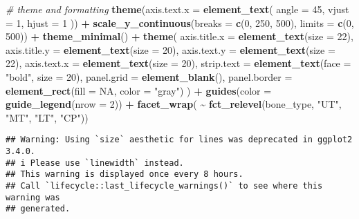 \documentclass[
]{article}
\newenvironment{Shaded}{\begin{snugshade}}{\end{snugshade}}
\newcommand{\AttributeTok}[1]{\textcolor[rgb]{0.13,0.29,0.53}{#1}}
\newcommand{\CommentTok}[1]{\textcolor[rgb]{0.56,0.35,0.01}{\textit{#1}}}
\newcommand{\ConstantTok}[1]{\textcolor[rgb]{0.56,0.35,0.01}{#1}}
\newcommand{\DecValTok}[1]{\textcolor[rgb]{0.00,0.00,0.81}{#1}}
\newcommand{\FunctionTok}[1]{\textcolor[rgb]{0.13,0.29,0.53}{\textbf{#1}}}
\newcommand{\NormalTok}[1]{#1}
\newcommand{\SpecialCharTok}[1]{\textcolor[rgb]{0.81,0.36,0.00}{\textbf{#1}}}
\newcommand{\StringTok}[1]{\textcolor[rgb]{0.31,0.60,0.02}{#1}}
\begin{document}
\begin{Shaded}
\begin{Highlighting}[]
  \CommentTok{\# theme and formatting}
  \FunctionTok{theme}\NormalTok{(}\AttributeTok{axis.text.x =} \FunctionTok{element\_text}\NormalTok{(}
    \AttributeTok{angle =} \DecValTok{45}\NormalTok{,}
    \AttributeTok{vjust =} \DecValTok{1}\NormalTok{,}
    \AttributeTok{hjust =} \DecValTok{1}
\NormalTok{  )) }\SpecialCharTok{+}
  \FunctionTok{scale\_y\_continuous}\NormalTok{(}\AttributeTok{breaks =} \FunctionTok{c}\NormalTok{(}\DecValTok{0}\NormalTok{, }\DecValTok{250}\NormalTok{, }\DecValTok{500}\NormalTok{), }\AttributeTok{limits =} \FunctionTok{c}\NormalTok{(}\DecValTok{0}\NormalTok{, }\DecValTok{500}\NormalTok{)) }\SpecialCharTok{+}
  \FunctionTok{theme\_minimal}\NormalTok{() }\SpecialCharTok{+}
  \FunctionTok{theme}\NormalTok{(}
    \AttributeTok{axis.title.x =} \FunctionTok{element\_text}\NormalTok{(}\AttributeTok{size =} \DecValTok{22}\NormalTok{),}
    \AttributeTok{axis.title.y =} \FunctionTok{element\_text}\NormalTok{(}\AttributeTok{size =} \DecValTok{20}\NormalTok{),}
    \AttributeTok{axis.text.y =} \FunctionTok{element\_text}\NormalTok{(}\AttributeTok{size =} \DecValTok{22}\NormalTok{),}
    \AttributeTok{axis.text.x =} \FunctionTok{element\_text}\NormalTok{(}\AttributeTok{size =} \DecValTok{20}\NormalTok{),}
    \AttributeTok{strip.text =} \FunctionTok{element\_text}\NormalTok{(}\AttributeTok{face =} \StringTok{"bold"}\NormalTok{, }\AttributeTok{size =} \DecValTok{20}\NormalTok{),}
    \AttributeTok{panel.grid =} \FunctionTok{element\_blank}\NormalTok{(),}
    \AttributeTok{panel.border =} \FunctionTok{element\_rect}\NormalTok{(}\AttributeTok{fill =} \ConstantTok{NA}\NormalTok{, }\AttributeTok{color =} \StringTok{"gray"}\NormalTok{)}
\NormalTok{  ) }\SpecialCharTok{+}
  \FunctionTok{guides}\NormalTok{(}\AttributeTok{color =} \FunctionTok{guide\_legend}\NormalTok{(}\AttributeTok{nrow =} \DecValTok{2}\NormalTok{)) }\SpecialCharTok{+}
  \FunctionTok{facet\_wrap}\NormalTok{( }\SpecialCharTok{\textasciitilde{}} \FunctionTok{fct\_relevel}\NormalTok{(bone\_type, }\StringTok{"UT"}\NormalTok{, }\StringTok{"MT"}\NormalTok{, }\StringTok{"LT"}\NormalTok{, }\StringTok{"CP"}\NormalTok{))}
\end{Highlighting}
\end{Shaded}

\begin{verbatim}
## Warning: Using `size` aesthetic for lines was deprecated in ggplot2 3.4.0.
## i Please use `linewidth` instead.
## This warning is displayed once every 8 hours.
## Call `lifecycle::last_lifecycle_warnings()` to see where this warning was
## generated.
\end{verbatim}
\end{document}
